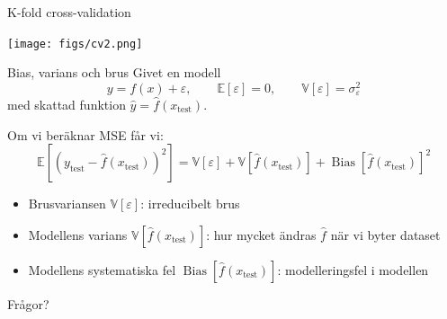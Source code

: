 \documentclass[10pt,english]{beamer}
\begin{document}
\begin{frame}{K-fold cross-validation}
    \begin{center}
        \texttt{[image: figs/cv2.png]}
    \end{center}
\end{frame}

\begin{frame}{Bias, varians och brus}
    Givet en modell
    \begin{equation*}
        y = f(x) + \varepsilon, \qquad \mathbb{E}[\varepsilon] = 0, \qquad \mathbb{V}[\varepsilon] = \sigma^2_{\varepsilon}
    \end{equation*}
    med skattad funktion $\hat{y} = \hat{f}(x_{\text{test}})$.

    Om vi beräknar MSE får vi:
    \begin{equation*}
        \mathbb{E}\left[ \left( y_{\text{test}} - \hat{f}(x_{\text{test}}) \right)^2 \right] = \mathbb{V}[\varepsilon] + \mathbb{V}\left[\hat{f}(x_{\text{test}})\right] + \operatorname{Bias}\left[\hat{f}(x_{\text{test}})\right]^2
    \end{equation*}
    \begin{itemize}
        \item Brusvariansen $\mathbb{V}[\varepsilon]$: irreducibelt brus
        \item Modellens varians $\mathbb{V}[\hat{f}(x_{\text{test}})]$: hur mycket ändras $\hat{f}$ när vi byter dataset
        \item Modellens systematiska fel $\operatorname{Bias}[\hat{f}(x_{\text{test}})]$: modelleringsfel i modellen
    \end{itemize}
\end{frame}

\begin{frame}{Frågor?}
    
\end{frame}
\end{document}
